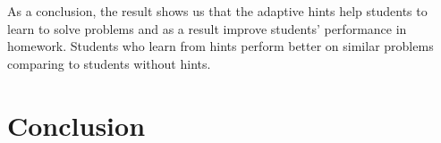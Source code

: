 \documentclass{llncs}
\begin{document}
As a conclusion, the result shows us that the adaptive hints help students to learn to solve problems and as a result improve students' performance in homework. Students who learn from hints perform better on similar problems comparing to students without hints.

\section{Conclusion}


\newpage


\end{document}

